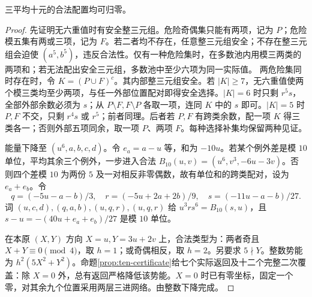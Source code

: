 \begin{lemma}\label{lem:ten}
三平均十元的合法配置均可归零。
\end{lemma}
\begin{proof}
先证明无六重值时有安全整三元组。危险奇偶集只能有两项，记为 $P$；危险模五集有两或三项，记为 $F$。若二者均不存在，任意整三元组安全；不存在整三元组会迫使 $(a^5,b^5)$，违反合法性。仅有一种危险集时，在多数池内用模三两类的两项和；若无法配出安全三元组，多数池中至少六项为同一实际值。
两危险集同时存在时，令 $K=(P\cup F)^c$。其内部整三元组安全。若 $|K|\ge7$，无六重值使两个模三类均至少两项，与任一外部位置配对即得安全选择。$|K|=6$ 时只剩 $r^5s$，全部外部余数必须为 $s$；从 $P\setminus F,F\setminus P$ 各取一项，连同 $K$ 中的 $s$ 即可。$|K|=5$ 时 $P,F$ 不交，只剩 $r^4s$ 或 $r^5$；前者同理。后者若 $P,F$ 有跨类余数，配一项 $K$ 得三类各一；否则外部五项同余，取一项 $P$、两项 $F$。每种选择补集均保留两种见证。

能量下降至 $(u^6,a,b,c,d)$。令 $e_a=a-u$ 等，和为 $-10u$。若某个例外差是模 $10$ 单位，平均其余三个例外，一步进入合法 $B_{10}(u,v)=(u^6,v^3,-6u-3v)$。否则四个差模 $10$ 为两份 $5$ 及一对相反非零偶数，故有单位和的跨类配对，设为 $e_a+e_b$。令
\[q=(-5u-a-b)/3,\quad r=(-5u+2a+2b)/9,\quad s=(-11u-a-b)/27.
\]
词 $(u,c,d),(q,a,b),(u,q,r),(u,q,r)$ 给 $u^3r s^6=B_{10}(s,u)$，且 $s-u=-(40u+e_a+e_b)/27$ 是模 $10$ 单位。

在本原 $(X,Y)$ 方向 $X=u,Y=3u+2v$ 上，合法类型为：两者奇且 $X+Y\equiv0\pmod4$，取 $h=1$；或奇偶相反，取 $h=2$。另要求 $5\nmid Y$。整数势能为 $h^2(5X^2+Y^2)$。命题\ref{prop:ten-certificate}给七个实际返回及十二个完整二次覆盖：除 $X=0$ 外，总有返回严格降低该势能。$X=0$ 时已有零坐标，固定一个零，对其余九个位置采用两层三进网络。由整数下降完成。
\end{proof}

